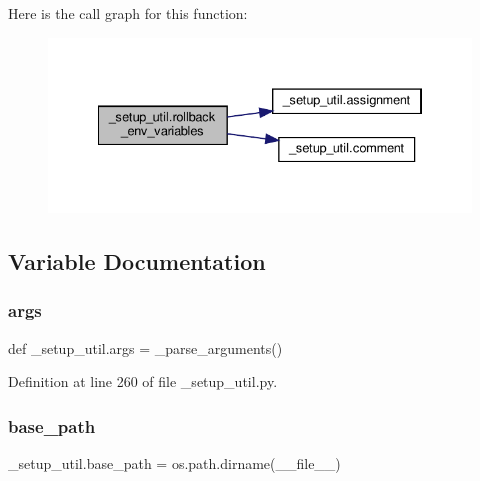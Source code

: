 Here is the call graph for this function\+:
\nopagebreak
\begin{figure}[H]
\begin{center}
\leavevmode
\includegraphics[width=334pt]{namespace__setup__util_af3030db6102b5aa35cd354a2fb6cca03_cgraph}
\end{center}
\end{figure}


\subsection{Variable Documentation}
\mbox{\label{namespace__setup__util_a831491331b0650d492585147f04d6615}} 
\subsubsection{\texorpdfstring{args}{args}}
{\footnotesize\ttfamily def \+\_\+setup\+\_\+util.\+args = \+\_\+parse\+\_\+arguments()}



Definition at line 260 of file \+\_\+setup\+\_\+util.\+py.

\mbox{\label{namespace__setup__util_a83d25140acd7788bbcb95843fe38e639}} 
\subsubsection{\texorpdfstring{base\+\_\+path}{base\_path}}
{\footnotesize\ttfamily \+\_\+setup\+\_\+util.\+base\+\_\+path = os.\+path.\+dirname(\+\_\+\+\_\+file\+\_\+\+\_\+)}



